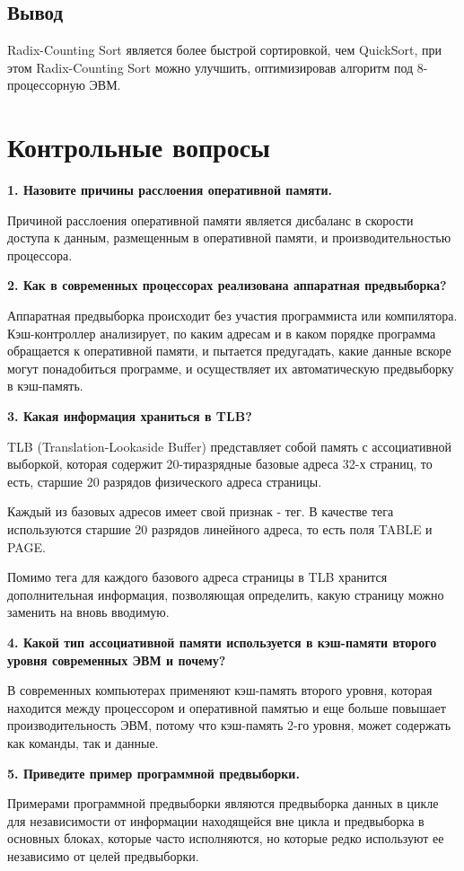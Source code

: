 \section{Вывод}

Radix-Counting Sort является более быстрой сортировкой, чем QuickSort, при этом Radix-Counting Sort можно улучшить, оптимизировав алгоритм под 8-процессорную ЭВМ.

\chapter{Контрольные вопросы}

\textbf{1. Назовите причины расслоения оперативной памяти.}

Причиной расслоения оперативной памяти является дисбаланс в скорости доступа к данным, размещенным в оперативной памяти, и производительностью процессора.

\textbf{2. Как в современных процессорах реализована аппаратная предвыборка?}

Аппаратная предвыборка происходит без участия программиста или компилятора. Кэш-контроллер анализирует, по каким адресам и в каком порядке программа обращается к оперативной памяти, и пытается предугадать, какие данные вскоре могут понадобиться программе, и осуществляет их автоматическую предвыборку в кэш-память.

\textbf{3. Какая информация храниться в TLB?}

TLB (Translation-Lookaside Buffer) представляет собой память с ассоциативной выборкой, которая содержит 20-тиразрядные базовые адреса 32-х страниц, то есть, старшие 20 разрядов физического адреса страницы.

Каждый из базовых адресов имеет свой признак - тег. В качестве тега используются старшие 20 разрядов линейного адреса, то есть поля TABLE и PAGE.

Помимо тега для каждого базового адреса страницы в TLB хранится
дополнительная информация, позволяющая определить, какую страницу можно заменить на вновь вводимую.

\textbf{4. Какой тип ассоциативной памяти используется в кэш-памяти второго уровня
современных ЭВМ и почему?}

В современных компьютерах применяют кэш-память второго уровня,
которая находится между процессором и оперативной памятью и еще больше повышает производительность ЭВМ, потому что кэш-память 2-го уровня, может содержать как команды, так и данные.

\textbf{5. Приведите пример программной предвыборки.}

Примерами программной предвыборки являются предвыборка данных в цикле для независимости от информации находящейся вне цикла и предвыборка в основных блоках, которые часто исполняются, но которые редко используют ее независимо от целей предвыборки.